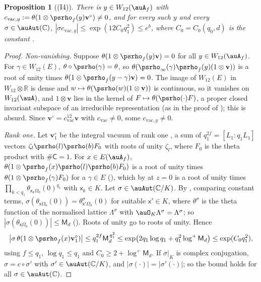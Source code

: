 \documentclass[10pt]{amsart}
\newtheorem{proposition}[theorem]{Proposition}
\theoremstyle{definition}
\theoremstyle{remark}
\newcommand{\C}{\mathbb C}
\newcommand{\R}{\mathbb R}
\providecommand{\psvac}{\mathbf v}
\begin{document}
\begin{proposition}[(I4)]\label{pst:I4}
There is $y\in W_{12}(\auA_f)$ with $c_{\mathrm{vac},y}:=\theta(1\otimes\psrho_f(y)\psvac^\circ)\ne0$, and for every
such $y$ and every $\sigma\in\auAut(\C)$, $|\sigma c_{\mathrm{vac},y}|\le\exp(12C_0q_1^2)\le e^b$, where $C_0=
C_0(q_0,d)$ is the constant {\cite[(76)]{P49}}.
\end{proposition}
\begin{proof}
\emph{Non-vanishing.} Suppose $\theta(1\otimes\psrho_f(y)\psvac)=0$ for all $y\in W_{12}(\auA_f)$.
For $\gamma\in W_{12}(E)$, $\theta\circ\psrho(\gamma)=\theta$, so $\theta(\psrho_\infty(\gamma)
\psrho_f(y)(1\otimes\psvac))$ is a root of unity times $\theta(1\otimes\psrho_f(y-\gamma)\psvac)=0$.
The image of $W_{12}(E)$ in $W_{12}\otimes\R$ is dense and $w\mapsto\theta(\psrho(w)(1\otimes
\psvac))$ is continuous, so it vanishes on $W_{12}(\auA)$, and $1\otimes\psvac$ lies in the kernel of
$F\mapsto\theta(\psrho(\cdot)F)$, a proper closed invariant subspace of an irreducible
representation (as in the proof of {\cite[Lemma~5.26]{P49}}); this is absurd. Since
$\psvac^\circ=c_{\mathrm{vac}}^{12}\psvac$ with $c_{\mathrm{vac}}\ne0$, some $c_{\mathrm{vac},y}\ne0$.

\emph{Rank one.} Let $\psvac^\circ_1$ be the integral vacuum of rank one {\cite[(58)]{P49}}, a sum
of $q_1^{2f}=[L_1:q_1L_1]$ vectors $\zeta_l\psrho(l)\psrho(b)F_0$ with roots of unity $\zeta_l$, where
$F_0$ is the theta product {\cite[(56)]{P49}} with $\#\mathsf C=1$. For $x\in E(\auA_f)$,
$\theta(1\otimes\psrho_f(x)\psrho(l)\psrho(b)F_0)$ is a root of unity times $\theta(1\otimes
\psrho_f(\gamma)F_0)$ for a $\gamma\in E$ ({\cite[\S5.2.8]{P49}}), which by {\cite[(57)]{P49}} at
$z=0$ is a root of unity times $\prod_{k<q_1}\theta_{\mathsf x_k\Omega_0}(0)^{q_1}$ with $\mathsf
x_k\in K$. Let $\sigma\in\auAut(\C/K)$. By {\cite[Theorem~7.9(b)]{P49}}, comparing constant terms,
$\sigma(\theta_{\mathsf x\Omega_0}(0))=\theta^\sigma_{\mathsf x'\Omega_\sigma}(0)$ for suitable
$\mathsf x'\in K$, where $\theta^\sigma$ is the theta function of the normalised lattice
$\Lambda^\sigma$ with $\auO_K\Lambda^\sigma=\Lambda^\sigma$; so $|\sigma(\theta_{\mathsf x\Omega_0}
(0))|\le\mathsf M_d$ ({\cite[(76)]{P49}}). Roots of unity go to roots of unity. Hence
\[
\bigl|\sigma\,\theta(1\otimes\psrho_f(x)\psvac^\circ_1)\bigr|\le q_1^{2f}\mathsf M_d^{\,q_1^2}\le
\exp\bigl(2q_1\log q_1+q_1^2\log^+\mathsf M_d\bigr)\le\exp(C_0q_1^2),
\]
using $f\le q_1$, $\log q_1\le q_1$ and $C_0\ge2+\log^+\mathsf M_d$. If $\sigma|_K$ is complex
conjugation, $\sigma=c\circ\sigma'$ with $\sigma'\in\auAut(\C/K)$, and $|\sigma(\cdot)|=|\sigma'(
\cdot)|$; so the bound holds for all $\sigma\in\auAut(\C)$.


\end{proof}
\end{document}
